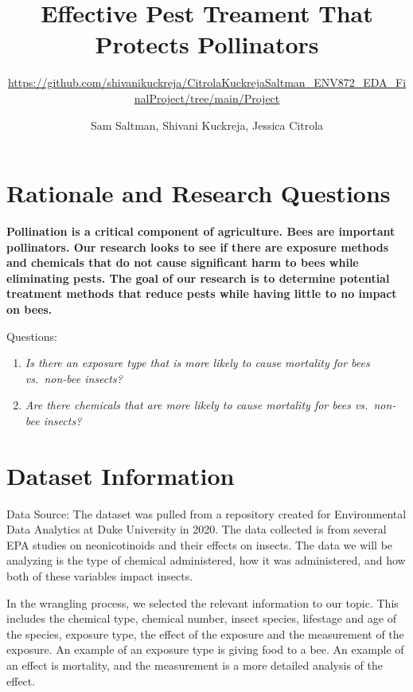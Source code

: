 \documentclass[
  12pt,
]{article}
\title{Effective Pest Treament That Protects Pollinators}
\subtitle{\url{https://github.com/shivanikuckreja/CitrolaKuckrejaSaltman_ENV872_EDA_FinalProject/tree/main/Project}}
\author{Sam Saltman, Shivani Kuckreja, Jessica Citrola}
\date{}
\begin{document}
\maketitle

\newpage
\tableofcontents 
\newpage
\listoftables 
\newpage
\listoffigures 
\newpage

\hypertarget{rationale-and-research-questions}{%
\section{Rationale and Research
Questions}\label{rationale-and-research-questions}}

\textbf{Pollination is a critical component of agriculture. Bees are
important pollinators. Our research looks to see if there are exposure
methods and chemicals that do not cause significant harm to bees while
eliminating pests. The goal of our research is to determine potential
treatment methods that reduce pests while having little to no impact on
bees.}

Questions:

\begin{enumerate}
\def\labelenumi{\arabic{enumi}.}
\item
  \emph{Is there an exposure type that is more likely to cause mortality
  for bees vs.~non-bee insects?}
\item
  \emph{Are there chemicals that are more likely to cause mortality for
  bees vs.~non-bee insects?}
\end{enumerate}

\newpage

\hypertarget{dataset-information}{%
\section{Dataset Information}\label{dataset-information}}

Data Source: The dataset was pulled from a repository created for
Environmental Data Analytics at Duke University in 2020. The data
collected is from several EPA studies on neonicotinoids and their
effects on insects. The data we will be analyzing is the type of
chemical administered, how it was administered, and how both of these
variables impact insects.

In the wrangling process, we selected the relevant information to our
topic. This includes the chemical type, chemical number, insect species,
lifestage and age of the species, exposure type, the effect of the
exposure and the measurement of the exposure. An example of an exposure
type is giving food to a bee. An example of an effect is mortality, and
the measurement is a more detailed analysis of the effect.
\end{document}
